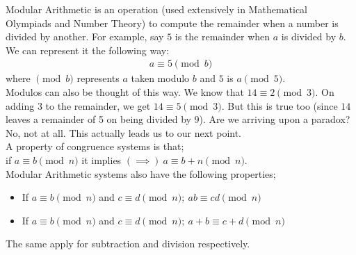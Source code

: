 \begin{mathbox}{}
{Modular Arithmetic is an operation (used extensively in Mathematical Olympiads and Number Theory) to compute the remainder when a number is divided by another. For example, say $5$ is the remainder when $a$ is divided by $b$. We can represent it the following way:
\begin{align*}
    a \equiv 5 \pmod b
\end{align*}
where $\pmod b$ represents $a$ taken modulo $b$ and $5$ is $a \pmod 5$.}\\
Modulos can also be thought of this way. We know that $14 \equiv 2 \pmod 3$. On adding $3$ to the remainder, we get $14 \equiv 5 \pmod 3$. But this is true too (since $14$ leaves a remainder of 5 on being divided by $9$). Are we arriving upon a paradox? No, not at all.
This actually leads us to our next point.\\
A property of congruence systems is that;\\
if $a \equiv b \pmod n$ it implies $(\implies)~a \equiv b + n \pmod n$.\\
Modular Arithmetic systems also have the following properties;
\begin{itemize}
    \item{If $a \equiv b \pmod n$ and $c \equiv d \pmod n;~ab \equiv cd \pmod n$}
    \item{If $a \equiv b \pmod n$ and $c \equiv d \pmod n;~a + b \equiv c + d \pmod n$}
\end{itemize}
The same apply for subtraction and division respectively.
\end{mathbox}
